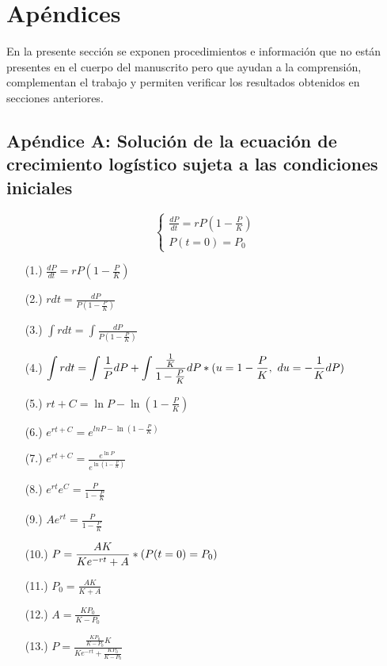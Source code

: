 \chapter{Ap\'endices}
En la presente secci\'on se exponen procedimientos e informaci\'on que no est\'an presentes en el cuerpo del manuscrito pero que ayudan a la comprensi\'on, complementan el trabajo y permiten verificar los resultados obtenidos en secciones anteriores. 

\section{Ap\'endice A: Soluci\'on de la ecuaci\'on de crecimiento log\'istico sujeta a las condiciones iniciales}
\label{app-a}

\begin{equation*}
\boxed{\left\lbrace
	\begin{array}{l}		
		\displaystyle\frac{dP}{dt} = rP(1-\displaystyle\frac{P}{K})\\
		P(t=0)=P_0
	\end{array}
\right.}
\end{equation*}

\begin{minipage}[t]{0.45\textwidth}
\begin{enumerate}
\item [(1.)] $\displaystyle \frac{dP}{dt} = rP(1-\frac{P}{K})$
\item [(2.)] $\displaystyle rdt = \frac{dP}{P(1-\frac{P}{K})}$
\item [(3.)] $\displaystyle \int rdt = \int \frac{dP}{P(1-\frac{P}{K})}$
\item [(4.)] $\displaystyle \int rdt = \int \frac{1}{P}dP + \int \frac{\frac{1}{K}}{1-\frac{P}{K}}dP \\ *(\displaystyle u=1-\frac{P}{K},~\displaystyle du=-\frac{1}{K}dP)$
\item [(5.)] $\displaystyle rt+C = \ln P - \ln(1-\frac{P}{K})$
\item [(6.)] $\displaystyle e^{rt+C} = e^{lnP - \ln(1-\frac{P}{K})}$
\item [(7.)] $\displaystyle e^{rt+C} = \frac{e^{\ln P}}{e^{\ln(1-\frac{P}{K})}}$
\end{enumerate}
\end{minipage} \hfill 
\begin{minipage}[t]{0.45\textwidth}
\begin{enumerate}
\item [(8.)] $\displaystyle e^{rt}e^C = \frac{P}{1-\frac{P}{K}}$
\item [(9.)] $\displaystyle Ae^{rt} = \frac{P}{1-\frac{P}{K}}$
\item [(10.)] $\displaystyle P = \frac{AK}{Ke^{-rt}+A} \\ *(P(t=0)=P_0)$
\item [(11.)] $\displaystyle P_0 = \frac{AK}{K+A}$
\item [(12.)] $\displaystyle A = \frac{K P_0}{K-P_0}$
\item [(13.)] $\displaystyle P = \frac{\frac{K P_0}{K-P_0}K}{Ke^{-rt}+\frac{K P_0}{K-P_0}}$
\end{enumerate}
\end{minipage}

